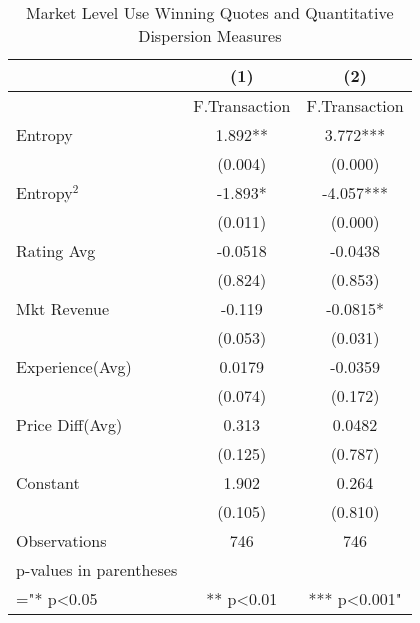 \begin{table}
\centering
\begin{tabular}{@{}lcc@{}}
\toprule
 & (1) & (2) \\ \midrule
 & F.Transaction & F.Transaction \\
Entropy & 1.892** & 3.772*** \\
 & (0.004) & (0.000) \\
Entropy$^2$ & -1.893* & -4.057*** \\
 & (0.011) & (0.000) \\
Rating Avg & -0.0518 & -0.0438 \\
 & (0.824) & (0.853) \\
Mkt Revenue & -0.119 & -0.0815* \\
 & (0.053) & (0.031) \\
Experience(Avg) & 0.0179 & -0.0359 \\
 & (0.074) & (0.172) \\
Price Diff(Avg) & 0.313 & 0.0482 \\
 & (0.125) & (0.787) \\
Constant & 1.902 & 0.264 \\
 & (0.105) & (0.810) \\
Observations & 746 & 746 \\
p-values in parentheses &  &  \\
="* p\textless{}0.05 & ** p\textless{}0.01 & *** p\textless{}0.001" \\ \bottomrule
\end{tabular}
\caption{Market Level Use Winning Quotes and Quantitative Dispersion Measures}
\label{reg_mkt_1}
\end{table}